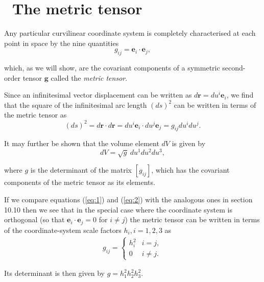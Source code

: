 \documentclass[9pt, twoside]{extbook}
\begin{document}
\vspace*{\fill}

\section{\thesection~The metric tensor}

\noindent Any particular curvilinear coordinate system is completely characterised at each point in space by the nine quantities
\begin{equation}
	\label{eq:0}
	g_{ij} = \boldsymbol{e}_{i} \cdot \boldsymbol{e}_{j},
\end{equation}

\noindent which, as we will show, are the covariant components of a symmetric second-order tensor $\boldsymbol{g}$ called the \textit{metric tensor}.

Since an infinitesimal vector displacement can be written as $d\boldsymbol{r} = du^{i}\boldsymbol{e}_{i}$, we find that the square of the infinitesimal arc length $(ds)^{2}$ can be written in terms of the metric tensor as
\begin{equation}
	\label{eq:1}
	(ds)^{2} = d\boldsymbol{r} \cdot d\boldsymbol{r} = du^{i}\boldsymbol{e}_{i} \cdot du^{j}\boldsymbol{e}_{j} = g_{ij}du^{i}du^{j}.
\end{equation}

\noindent It may further be shown that the volume element $dV$ is given by
\begin{equation}
	\label{eq:2}
	dV = \sqrt{g} \ du^{1}du^{2}du^{3},
\end{equation}

\noindent where $g$ is the determinant of the matrix $[g_{ij}]$, which has the covariant components of the metric tensor as its elements.

If we compare equations (\ref{eq:1}) and (\ref{eq:2}) with the analogous ones in section 10.10 then we see that in the special case where the coordinate system is orthogonal (so that $\boldsymbol{e}_{i} \cdot \boldsymbol{e}_{j} = 0$ for $i \neq j$) the metric tensor can be written in terms of the coordinate-system scale factors $h_{i}, i = 1, 2, 3$ as
\begin{align*}
	g_{ij} = \begin{cases} h_{i}^{2} & i = j, \\ 0& i \neq j. \end{cases}
\end{align*}

\noindent Its determinant is then given by $g = h^{2}_{1}h^{2}_{2}h^{2}_{3}$.
\end{document}
